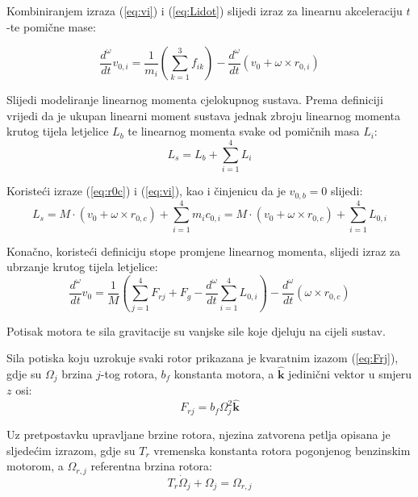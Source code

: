 \documentclass[11pt,a4paper]{article}
\begin{document}
Kombiniranjem izraza (\ref{eq:vi}) i (\ref{eq:Lidot}) slijedi izraz za linearnu akceleraciju $t$-te pomične mase:

\begin{equation}
\frac{d^{\omega}}{dt}v_{0,i} = \frac{1}{m_{i}}\left(\sum_{k=1}^{3}f_{ik}\right) - \frac{d^{\omega}}{dt} \left( v_{0} + \omega \times r_{0,i} \right) 
\label{eq:voidot}
\end{equation}

Slijedi modeliranje linearnog momenta cjelokupnog sustava. Prema definiciji vrijedi da je ukupan linearni moment sustava jednak zbroju linearnog momenta krutog tijela letjelice $L_{b}$ te linearnog momenta svake od pomičnih masa $L_{i}$:
\begin{equation}
L_{s} = L_{b} + \sum_{i=1}^{4}L_{i}
\label{eq:Ls}
\end{equation}

Koristeći izraze (\ref{eq:r0c}) i (\ref{eq:vi}), kao i činjenicu da je $v_{0,b} = 0$ slijedi:
\begin{equation}
L_{s} = M \cdot (v_{0} + \omega \times r_{0,c}) + \sum_{i=1}^{4}m_{i}c_{0,i} = M \cdot (v_{0} + \omega \times r_{0,c}) + \sum_{i=1}^{4}L_{0,i}
\label{eq:Ls2}
\end{equation}

Konačno, koristeći definiciju stope promjene linearnog momenta, slijedi izraz za ubrzanje krutog tijela letjelice:
\begin{equation}
\frac{d^{\omega}}{dt} v_{0} = \frac{1}{M} \left( \sum_{j=1}^{4} F_{rj} + F_{g} - \frac{d^{\omega}}{dt} \sum_{i=1}^{4}L_{0,i}  \right) - \frac{d^{\omega}}{dt} (\omega \times r_{0,c})
\label{eq:v0dot}
\end{equation}

Potisak motora te sila gravitacije su vanjske sile koje djeluju na cijeli sustav.

Sila potiska koju uzrokuje svaki rotor prikazana je kvaratnim izazom (\ref{eq:Frj}), gdje su $\Omega_{j}$ brzina $j$-tog rotora, $b_{f}$ konstanta motora, a  $\bm{\hat{k}}$ jedinični vektor u smjeru $z$ osi:
\begin{equation}
F_{rj} = b_{f}\Omega_{j}^{2} \bm{\hat{k}}
\label{eq:Frj}
\end{equation}


Uz pretpostavku upravljane brzine rotora, njezina zatvorena petlja opisana je sljedećim izrazom, gdje su $T_{r}$ vremenska konstanta rotora pogonjenog benzinskim motorom, a $\Omega_{r,j}$ referentna brzina rotora:
\begin{equation}
T_{r}\dot{\Omega}_{j} + \Omega_{j} = \Omega_{r,j}
\label{eq:omega_rj}
\end{equation}
\end{document}
